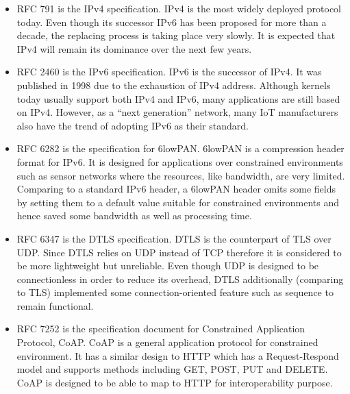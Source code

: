 \begin{itemize}
\item{RFC 791\cite{rfc791}} is the IPv4 specification. IPv4 is the most widely deployed protocol today. Even though its successor IPv6 has been proposed for more than a decade, the replacing process is taking place very slowly. It is expected that IPv4 will remain its dominance over the next few years.

\item{RFC 2460\cite{rfc2460}} is the IPv6 specification. IPv6 is the successor of IPv4. It was published in 1998 due to the exhaustion of IPv4 address. Although kernels today usually support both IPv4 and IPv6, many applications are still based on IPv4. However, as a “next generation” network, many IoT manufacturers also have the trend of adopting IPv6 as their standard.

\item{RFC 6282\cite{rfc6282}} is the specification for 6lowPAN. 6lowPAN is a compression header format for IPv6. It is designed for applications over constrained environments such as sensor networks where the resources, like bandwidth, are very limited. Comparing to a standard IPv6 header, a 6lowPAN header omits some fields by setting them to a default value suitable for constrained environments and hence  saved some bandwidth as well as processing time.

\item{RFC 6347\cite{rfc6347}} is the DTLS specification. DTLS is the counterpart of TLS over UDP. Since DTLS relies on UDP instead of TCP therefore it is considered to be more lightweight but unreliable. Even though UDP is designed to be connectionless in order to reduce its overhead, DTLS additionally (comparing to TLS) implemented some connection-oriented feature such as sequence to remain functional.

\item{RFC 7252\cite{rfc7252}} is the specification document for Constrained Application Protocol, CoAP. CoAP is a general application protocol for constrained environment. It has a similar design to HTTP which has a Request-Respond model and supports methods including GET, POST, PUT and DELETE. CoAP is designed to be able to map to HTTP for interoperability purpose.
\end{itemize}
